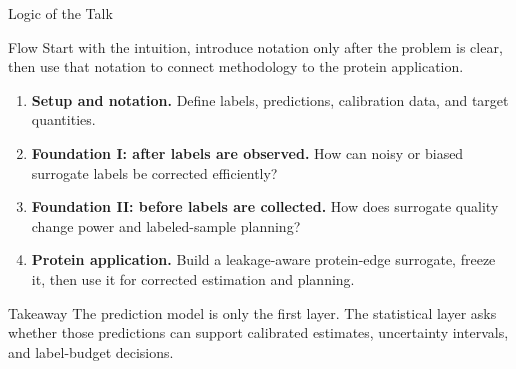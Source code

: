 \documentclass[aspectratio=169,10pt]{beamer}
\begin{document}
\begin{frame}{Logic of the Talk}
\begin{block}{Flow}
Start with the intuition, introduce notation only after the problem is clear, then use that notation to connect methodology to the protein application.
\end{block}

\begin{enumerate}
  \item \textbf{Setup and notation.} Define labels, predictions, calibration data, and target quantities.
  \item \textbf{Foundation I: after labels are observed.} How can noisy or biased surrogate labels be corrected efficiently?
  \item \textbf{Foundation II: before labels are collected.} How does surrogate quality change power and labeled-sample planning?
  \item \textbf{Protein application.} Build a leakage-aware protein-edge surrogate, freeze it, then use it for corrected estimation and planning.
\end{enumerate}

\vspace{0.15cm}
\begin{block}{Takeaway}
The prediction model is only the first layer. The statistical layer asks whether those predictions can support calibrated estimates, uncertainty intervals, and label-budget decisions.
\end{block}
\end{frame}
\end{document}
